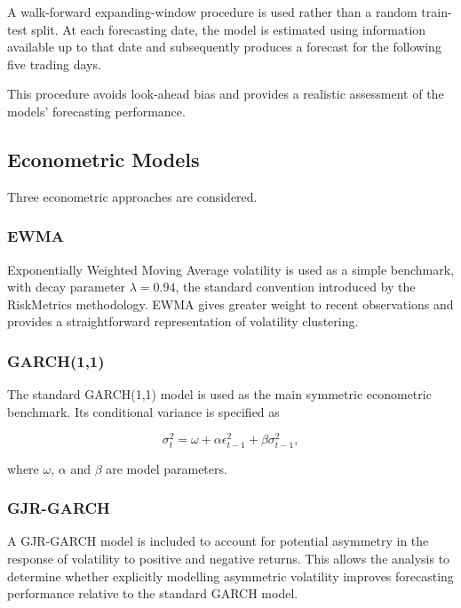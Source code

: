 \documentclass[12pt,a4paper]{article}
\begin{document}
A walk-forward expanding-window procedure is used rather than a random train-test split. At
each forecasting date, the model is estimated using information available up to that date and
subsequently produces a forecast for the following five trading days.

This procedure avoids look-ahead bias and provides a realistic assessment of the models' forecasting
performance.

\subsection{Econometric Models}

Three econometric approaches are considered.

\subsubsection{EWMA}

Exponentially Weighted Moving Average volatility is used as a simple benchmark, with decay
parameter $\lambda = 0.94$, the standard convention introduced by the RiskMetrics methodology. EWMA
gives greater weight to recent observations and provides a straightforward representation of
volatility clustering.

\subsubsection{GARCH(1,1)}

The standard GARCH(1,1) model is used as the main symmetric econometric benchmark. Its
conditional variance is specified as

\begin{equation}
\sigma_t^2 =
\omega +
\alpha \epsilon_{t-1}^2 +
\beta \sigma_{t-1}^2,
\end{equation}

where $\omega$, $\alpha$ and $\beta$ are model parameters.

\subsubsection{GJR-GARCH}

A GJR-GARCH model is included to account for potential asymmetry in the response of volatility
to positive and negative returns. This allows the analysis to determine whether explicitly modelling
asymmetric volatility improves forecasting performance relative to the standard GARCH model.
\end{document}
